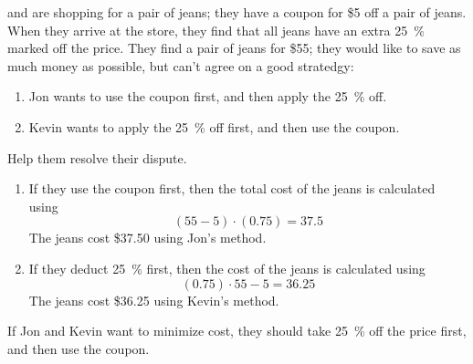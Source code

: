 \begin{figure}[!htb]
  \centering
    \caption{}
  \end{figure}
\begin{pccexample}[Coupons]\label{fun:ex:coupons}
 and  are shopping for a pair of jeans; 
they have a coupon for \$5 off a pair of jeans. When they arrive at 
the store, they find that all jeans have an extra \SI{25}{\percent} 
marked off the price. They find a pair of jeans for \$55; they 
would like to save as much money as possible, but can't agree on a 
good stratedgy:
\begin{enumerate}
  \item Jon wants to use the coupon first, and then apply the \SI{25}{\percent} off.
  \item Kevin wants to apply the \SI{25}{\percent} off first, and then 
    use the coupon.
\end{enumerate}
Help them resolve their dispute.
\begin{pccsolution}
\begin{enumerate}
  \item If they use the coupon first, then the total cost of the jeans is
    calculated using
    \[
        (55-5)\cdot (0.75)=37.5
    \]
    The jeans cost \$37.50 using Jon's method.
  \item If they deduct \SI{25}{\percent} first, then the cost of the jeans
    is calculated using
    \[
        (0.75)\cdot 55 -5 = 36.25
    \]
    The jeans cost \$36.25 using Kevin's method.
\end{enumerate}
If Jon and Kevin want to minimize cost, they should take \SI{25}{\percent}
off the price first, and then use the coupon.
\end{pccsolution}
\end{pccexample}

